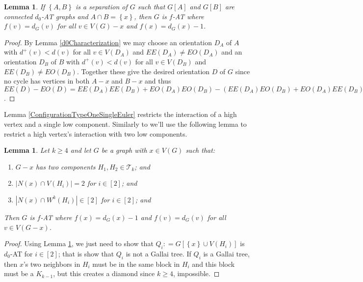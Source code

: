 \documentclass[12pt]{article}
\theoremstyle{plain}
\newtheorem{lem}[thm]{Lemma}
\theoremstyle{definition}
\theoremstyle{remark}
\newcommand{\fancy}[1]{\mathcal{#1}}
\newcommand{\T}{\fancy{T}}
\newcommand{\set}[1]{\left\{ #1 \right\}}
\newcommand{\card}[1]{\left|#1\right|}
\newcommand{\irange}[1]{\left[#1\right]}
\newcommand{\brackets}[1]{\left[ #1 \right]}
\newcommand{\DefinedAs}{\mathrel{\mathop:}=}
\begin{document}
\begin{lem}\label{CutvertexListPatchEuler}
If $\set{A, B}$ is a separation of $G$ such that $G[A]$ and $G[B]$ are connected $d_0$-AT graphs and $A \cap B = \set{x}$, then $G$ is $f$-AT where $f(v) = d_G(v)$ for all $v \in V(G) - x$ and $f(x) = d_G(x) - 1$.
\end{lem}
\begin{proof}
By Lemma \ref{d0Characterization} we may choose an orientation $D_A$ of $A$ with $d^+(v) < d(v)$ for all $v \in V(D_A)$ and $EE(D_A) \neq EO(D_A)$ and an orientation $D_B$ of $B$ with $d^+(v) < d(v)$ for all $v \in V(D_B)$ and $EE(D_B) \neq EO(D_B)$.  Together these give the desired orientation $D$ of $G$ since no cycle has vertices in both $A-x$ and $B-x$ and thus $EE(D) - EO(D) = EE(D_A)EE(D_B) + EO(D_A)EO(D_B) - (EE(D_A)EO(D_B) + EO(D_A)EE(D_B)) = (EE(D_A) - EO(D_A))(EE(D_B) - EO(D_B)) \neq 0$.
\end{proof}

Lemma \ref{ConfigurationTypeOneSingleEuler} restricts the interaction of a high vertex and a single low component.  Similarly to \cite{kostochkastiebitzedgesincriticalgraph} we'll use the following lemma to restrict a high vertex's interaction with two low components.

\begin{lem}\label{ConfigurationTypeOneDoubleEuler}
Let $k \geq 4$ and let $G$ be a graph with $x \in V(G)$ such that:
\begin{enumerate}
\item $G-x$ has two components $H_1, H_2 \in \T_k$; and
\item $\card{N(x) \cap V(H_i)} = 2$ for $i \in \irange{2}$; and
\item $\card{N(x) \cap W^k(H_i)} \in \irange{2}$ for $i \in \irange{2}$; and
\end{enumerate}

\noindent Then $G$ is $f$-AT where $f(x) = d_G(x) - 1$ and $f(v) = d_G(v)$ for all $v \in V(G - x)$.
\end{lem}
\begin{proof}
Using Lemma \ref{CutvertexListPatchEuler}, we just need to show that $Q_i \DefinedAs G\brackets{\set{x} \cup V(H_i)}$ is $d_0$-AT for $i \in \irange{2}$; that is show that $Q_i$ is not a Gallai tree.  
If $Q_i$ is a Gallai tree, then $x$'s two neighbors in $H_i$ must be in the same block in $H_i$ and this block must be a $K_{k-1}$, but this creates a diamond since $k \geq 4$, impossible.
\end{proof}
\end{document}
